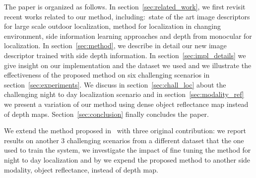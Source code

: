 

The paper is organized as follows. In section~\ref{sec:related_work}, we first revisit recent works related to our method, including:~state of the art image descriptors for large scale outdoor localization, method for localization in changing environment, side information learning approaches and depth from monocular for localization. In section~\ref{sec:method}, we describe in detail our new image descriptor trained with side depth information. In section~\ref{sec:impl_details} we give insight on our implementation and the dataset we used and we illustrate the effectiveness of the proposed method on six challenging scenarios in section~\ref{sec:experiments}. We discuss in section~\ref{sec:chall_loc} about the challenging night to day localization scenario and in section~\ref{sec:modality_ref} we present a variation of our method using dense object reflectance map instead of depth maps. Section~\ref{sec:conclusion} finally concludes the paper.

We extend the method proposed in~\cite{Piasco2019} with three original contribution: we report results on another 3 challenging scenarios from a different dataset that the one used to train the system, we investigate the impact of fine tuning the method for night to day localization and by we expend the proposed method to another side modality, object reflectance, instead of depth map.

